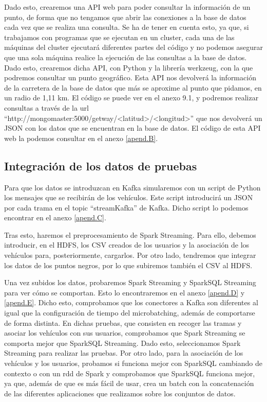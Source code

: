 Dado esto, crearemos una API web para poder consultar la información de un punto, de forma que no tengamos que abrir las conexiones a la base de datos cada vez que se realiza una consulta. Se ha de tener en cuenta esto, ya que, si trabajamos con programas que se ejecutan en un cluster, cada una de las máquinas del cluster ejecutará diferentes partes del código y no podemos asegurar que una sola máquina realice la ejecución de las consultas a la base de datos. Dado esto, crearemos dicha API, con Python y la librería werkzeug, con la que podremos consultar un punto geográfico. Esta API nos devolverá la información de la carretera de la base de datos que más se aproxime al punto que pidamos, en un radio de 1,11 km. El código se puede ver en el anexo 9.1, y podremos realizar consultas a través de la url “http://mongomaster:5000/getway/<latitud>/<longitud>” que nos devolverá un JSON con los datos que se encuentran en la base de datos. El código de esta API web la podemos consultar en el anexo \ref{apend.B}.

\subsection {Integración de los datos de pruebas \label{integracion}}

Para que los datos se introduzcan en Kafka simularemos con un script de Python los mensajes que se recibirán de los vehículos. Este script introducirá un JSON por cada trama en el topic “streamKafka” de Kafka. Dicho script lo podemos encontrar en el anexo \ref{apend.C}.

Tras esto, haremos el preprocesamiento de Spark Streaming. Para ello, debemos introducir, en el HDFS, los CSV creados de los usuarios y la asociación de los vehículos para, posteriormente, cargarlos. Por otro lado, tendremos que integrar los datos de los puntos negros, por lo que subiremos también el CSV al HDFS.

Una vez subidos los datos, probaremos Spark Streaming y SparkSQL Streaming para ver cómo se comportan. Esto lo encontraremos en el anexo \ref{apend.D} y \ref{apend.E}. Dicho esto, comprobamos que los conectores a Kafka son diferentes al igual que la configuración de tiempo del microbatching, además de comportarse de forma distinta. En dichas pruebas, que consisten en recoger las tramas y asociar los vehículos con sus usuarios, comprobamos que Spark Streaming se comporta mejor que SparkSQL Streaming. Dado esto, seleccionamos Spark Streaming para realizar las pruebas. Por otro lado, para la asociación de los vehículos y los usuarios, probamos si funciona mejor con SparkSQL cambiando de contexto o con un rdd de Spark y comprobamos que SparkSQL funciona mejor, ya que, además de que es más fácil de usar, crea un batch con la concatenación de las diferentes aplicaciones que realizamos sobre los conjuntos de datos.

